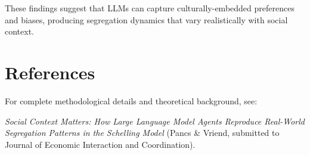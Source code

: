 \documentclass[11pt]{article}
\begin{document}
These findings suggest that LLMs can capture culturally-embedded preferences and biases, producing segregation dynamics that vary realistically with social context.

\section{References}

For complete methodological details and theoretical background, see:

\textit{Social Context Matters: How Large Language Model Agents Reproduce Real-World Segregation Patterns in the Schelling Model} (Pancs \& Vriend, submitted to Journal of Economic Interaction and Coordination).
\end{document}
